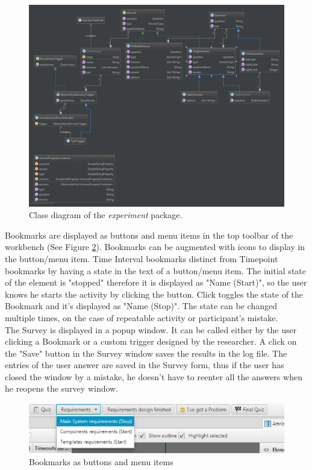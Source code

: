\begin{figure}[htb]
 \centering
\includegraphics[width=\textwidth]{figures/diagram.jpg}
\caption{Class diagram of the \textit{experiment} package.}
\label{fig:data_collection_diagram_actual}
\end{figure}

Bookmarks are displayed as buttons and menu items in the top toolbar of the workbench (See Figure \ref{fig:panel}). Bookmarks can be augmented with icons to display in the button/menu item. Time Interval bookmarks distinct from Timepoint bookmarks by having a state in the text of a button/menu item. The initial state of the element is "stopped" therefore it is displayed as "Name (Start)", so the user knows he starts the activity by clicking the button. Click toggles the state of the Bookmark and it's displayed as "Name (Stop)". The state can be changed multiple times, on the case of repeatable activity or participant's mistake.\\

The Survey is displayed in a popup window. It can be called either by the user clicking a Bookmark or a custom trigger designed by the researcher. A click on the "Save" button in the Survey window saves the results in the log file. The entries of the user answer are saved in the Survey form, thus if the user has closed the window by a mistake, he doesn't have to reenter all the answers when he reopens the survey window.\\



\begin{figure}[htb]
 \centering
\includegraphics[width=\textwidth]{figures/panel.jpg}
\caption{Bookmarks as buttons and menu items}
\label{fig:panel}
\end{figure}




